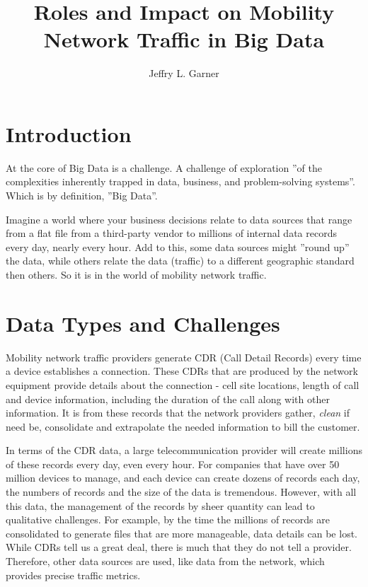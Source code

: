 \documentclass[sigconf]{acmart}
\begin{document}
\title{Roles and Impact on Mobility Network Traffic in Big Data}



\author{Jeffry L. Garner}



\maketitle

\section{Introduction}

At the core of Big Data is a challenge.   A challenge of exploration ''of the complexities inherently trapped in data, business, and problem-solving systems''.  \cite{www-cacm-acm-org} Which is by definition, ''Big Data''.

Imagine a world where your business decisions relate to data sources that range from a flat file from a third-party vendor to millions of internal data records every day, nearly every hour.  Add to this, some data sources might ''round up'' the data, while others relate the data (traffic) to a different geographic standard then others.  So it is in the world of mobility network traffic.


\section{Data Types and Challenges}

Mobility network traffic providers generate CDR (Call Detail Records) every time a device establishes a connection.  These CDRs that are produced by the network equipment provide details about the connection - cell site locations, length of call and device information, including the duration of the call along with other information.  It is from these records that the network providers gather, {\em clean} if need be, consolidate and extrapolate the needed information to bill the customer.  

In terms of the CDR data, a large telecommunication provider will create millions of these records every day, even every hour.  For companies that have over 50 million devices to manage, and each device can create dozens of records each day, the numbers of records and the size of the data is tremendous.  However,  with all this data, the management of the records by sheer quantity can lead to qualitative challenges.  For example, by the time the millions of records are consolidated to generate files that are more manageable, data details can be lost.   While CDRs tell us a great deal, there is much that they do not tell a provider.  Therefore, other data sources are used, like data from the network, which provides precise traffic metrics.
\end{document}
